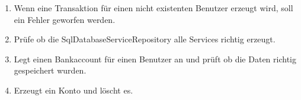 \begin{enumerate}
    \item {}
Wenn eine Transaktion für einen nicht existenten Benutzer erzeugt wird, soll ein Fehler geworfen werden. 
    

    \item {}
Prüfe ob die SqlDatabaseServiceRepository alle Services richtig erzeugt. 
    
    \item {}
Legt einen Bankaccount für einen Benutzer an und prüft ob die Daten richtig gespeichert wurden. 
    
    \item {}
Erzeugt ein Konto und löscht es. 
    
\end{enumerate}


